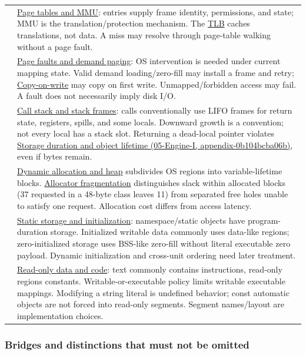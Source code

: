 {\begin{longtable}[]{@{}
  >{\raggedright\arraybackslash}p{}
  >{\raggedright\arraybackslash}p{}@{}}
55 & \hyperref[appendix-01e5905165c4]{Page tables and MMU}: entries supply frame identity, permissions, and state; MMU is the translation/protection mechanism. The \hyperref[appendix-7a2d9c5ce511]{TLB} caches translations, not data. A miss may resolve through page-table walking without a page fault. \\
56 & \hyperref[appendix-cc0909a7ef14]{Page faults and demand paging}: OS intervention is needed under current mapping state. Valid demand loading/zero-fill may install a frame and retry; \hyperref[appendix-7a06e5baac04]{Copy-on-write} may copy on first write. Unmapped/forbidden access may fail. A fault does not necessarily imply disk I/O. \\
57 & \hyperref[appendix-b081b7abe193]{Call stack and stack frames}: calls conventionally use LIFO frames for return state, registers, spills, and some locals. Downward growth is a convention; not every local has a stack slot. Returning a dead-local pointer violates \href{../05-Engine-I/main.pdf\#nameddest=appendix-0b104bcba06b}{Storage duration and object lifetime (05-Engine-I, appendix-0b104bcba06b)}, even if bytes remain. \\
58 & \hyperref[appendix-c3480f7d9ff3]{Dynamic allocation and heap} subdivides OS regions into variable-lifetime blocks. \hyperref[appendix-a7c50686d81f]{Allocator fragmentation} distinguishes slack within allocated blocks (37 requested in a 48-byte class leaves 11) from separated free holes unable to satisfy one request. Allocation cost differs from access latency. \\
59 & \hyperref[appendix-17c93c4c2f19]{Static storage and initialization}: namespace/static objects have program-duration storage. Initialized writable data commonly uses data-like regions; zero-initialized storage uses BSS-like zero-fill without literal executable zero payload. Dynamic initialization and cross-unit ordering need later treatment. \\
60 & \hyperref[appendix-5f9e5e2f0a5e]{Read-only data and code}: text commonly contains instructions, read-only regions constants. Writable-or-executable policy limits writable executable mappings. Modifying a string literal is undefined behavior; const automatic objects are not forced into read-only segments. Segment names/layout are implementation choices. \\
\end{longtable}
}

\subsubsection{Bridges and distinctions that must not be omitted}\label{appendix-fd090d982a15-bridges-and-distinctions-that-must-not-be-omitted}

